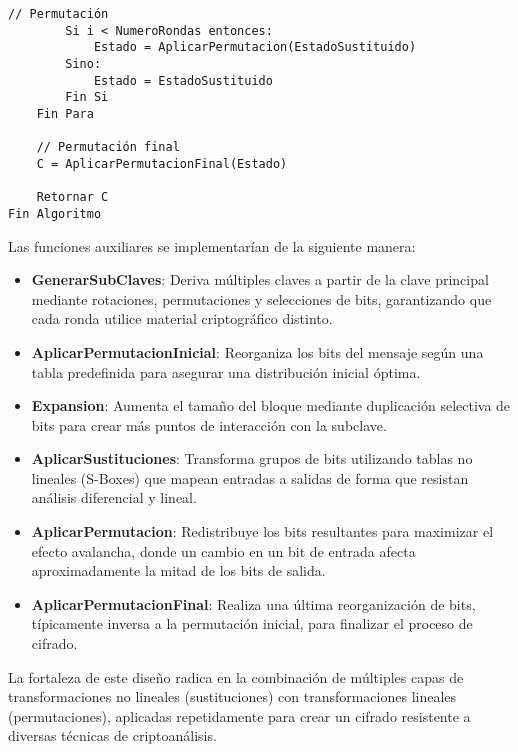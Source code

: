 {\begin{lstlisting}[basicstyle=\ttfamily\small]
        // Permutación
        Si i < NumeroRondas entonces:
            Estado = AplicarPermutacion(EstadoSustituido)
        Sino:
            Estado = EstadoSustituido
        Fin Si
    Fin Para
    
    // Permutación final
    C = AplicarPermutacionFinal(Estado)
    
    Retornar C
Fin Algoritmo
\end{lstlisting}

Las funciones auxiliares se implementarían de la siguiente manera:

\begin{itemize}
    \item \textbf{GenerarSubClaves}: Deriva múltiples claves a partir de la clave principal mediante rotaciones, permutaciones y selecciones de bits, garantizando que cada ronda utilice material criptográfico distinto.
    
    \item \textbf{AplicarPermutacionInicial}: Reorganiza los bits del mensaje según una tabla predefinida para asegurar una distribución inicial óptima.
    
    \item \textbf{Expansion}: Aumenta el tamaño del bloque mediante duplicación selectiva de bits para crear más puntos de interacción con la subclave.
    
    \item \textbf{AplicarSustituciones}: Transforma grupos de bits utilizando tablas no lineales (S-Boxes) que mapean entradas a salidas de forma que resistan análisis diferencial y lineal.
    
    \item \textbf{AplicarPermutacion}: Redistribuye los bits resultantes para maximizar el efecto avalancha, donde un cambio en un bit de entrada afecta aproximadamente la mitad de los bits de salida.
    
    \item \textbf{AplicarPermutacionFinal}: Realiza una última reorganización de bits, típicamente inversa a la permutación inicial, para finalizar el proceso de cifrado.
\end{itemize}

La fortaleza de este diseño radica en la combinación de múltiples capas de transformaciones no lineales (sustituciones) con transformaciones lineales (permutaciones), aplicadas repetidamente para crear un cifrado resistente a diversas técnicas de criptoanálisis.





}
